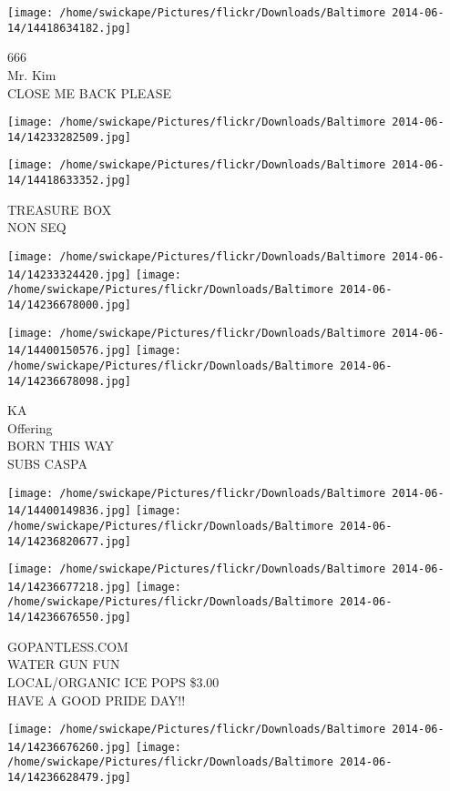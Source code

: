 \documentclass[10pt,letterpaper]{article}
\begin{document}
\vspace{0.25in}
\texttt{[image: /home/swickape/Pictures/flickr/Downloads/Baltimore 2014-06-14/14418634182.jpg]}

666\\
Mr. Kim\\
CLOSE ME BACK PLEASE
\pagebreak

\texttt{[image: /home/swickape/Pictures/flickr/Downloads/Baltimore 2014-06-14/14233282509.jpg]}

\vspace{0.25in}
\texttt{[image: /home/swickape/Pictures/flickr/Downloads/Baltimore 2014-06-14/14418633352.jpg]}

TREASURE BOX\\
NON SEQ
\pagebreak

\texttt{[image: /home/swickape/Pictures/flickr/Downloads/Baltimore 2014-06-14/14233324420.jpg]}
\texttt{[image: /home/swickape/Pictures/flickr/Downloads/Baltimore 2014-06-14/14236678000.jpg]}

\texttt{[image: /home/swickape/Pictures/flickr/Downloads/Baltimore 2014-06-14/14400150576.jpg]}
\texttt{[image: /home/swickape/Pictures/flickr/Downloads/Baltimore 2014-06-14/14236678098.jpg]}

KA\\
Offering\\
BORN THIS WAY\\
SUBS CASPA
\pagebreak

\texttt{[image: /home/swickape/Pictures/flickr/Downloads/Baltimore 2014-06-14/14400149836.jpg]}
\texttt{[image: /home/swickape/Pictures/flickr/Downloads/Baltimore 2014-06-14/14236820677.jpg]}

\texttt{[image: /home/swickape/Pictures/flickr/Downloads/Baltimore 2014-06-14/14236677218.jpg]}
\texttt{[image: /home/swickape/Pictures/flickr/Downloads/Baltimore 2014-06-14/14236676550.jpg]}

GOPANTLESS.COM\\
WATER GUN FUN\\
LOCAL/ORGANIC ICE POPS \$3.00\\
HAVE A GOOD PRIDE DAY!!
\pagebreak

\texttt{[image: /home/swickape/Pictures/flickr/Downloads/Baltimore 2014-06-14/14236676260.jpg]}
\texttt{[image: /home/swickape/Pictures/flickr/Downloads/Baltimore 2014-06-14/14236628479.jpg]}
\end{document}
